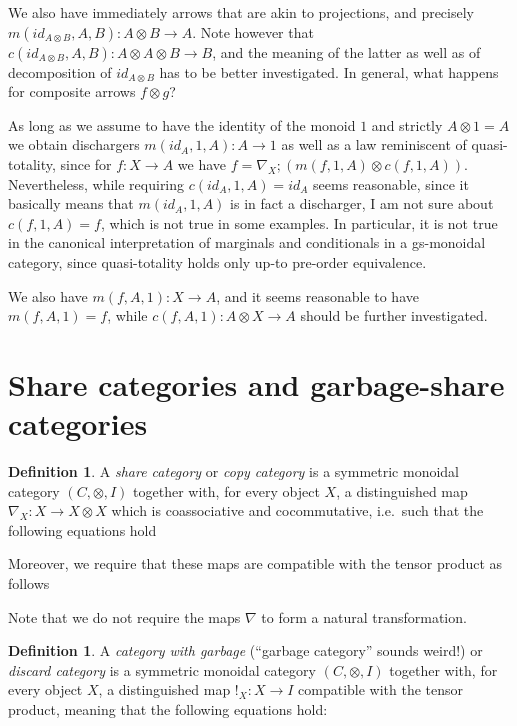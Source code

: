 \documentclass{article}
\theoremstyle{plain} %
\theoremstyle{definition} %
\newtheorem{definition}[theorem]{Definition}
\begin{document}
We also have immediately arrows that are akin to projections, and precisely $m(id_{A \otimes B}, A, B): A \otimes B \to A$. Note however that
$c(id_{A \otimes B}, A, B):  A \otimes A \otimes B \to B$, and the meaning of the latter as well as of decomposition of $id_{A \otimes B}$ has to be better investigated.
In general, what happens for composite arrows $f \otimes g$?

As long as we assume to have the identity of the monoid $1$ and strictly $A \otimes 1 = A$ we obtain dischargers $m(id_A, 1, A): A \to 1$ as well as a law reminiscent of quasi-totality, 
since for $f: X \to A$ we have
$f = \nabla_X ; (m(f, 1, A) \otimes c(f, 1, A))$. Nevertheless, while requiring $c(id_A, 1, A) = id_A$ seems reasonable, since it basically means that $m(id_A, 1, A)$ is in fact a discharger, I am not sure about 
$c(f, 1, A) = f$, which is not true in some examples. In particular, it is not true in the canonical interpretation of marginals and conditionals in a gs-monoidal category, since quasi-totality holds only 
up-to pre-order equivalence.

We also have $m(f, A, 1): X \to A$, and it seems reasonable to have $m(f, A, 1) = f$, while $c(f, A, 1): A \otimes X \to A$ should be further investigated. 

\section{Share categories and garbage-share categories}

\begin{definition}
	A \emph{share category} or \emph{copy category} is a symmetric monoidal category $(C,\otimes,I)$ together with, for every object $X$, a distinguished map $\nabla_X:X\to X\otimes X$
	which is coassociative and cocommutative, i.e.\ such that the following equations hold
	
	Moreover, we require that these maps are compatible with the tensor product as follows
\end{definition}

Note that we do not require the maps $\nabla$ to form a natural transformation.

\begin{definition}
	A \emph{category with garbage} (``garbage category'' sounds weird!) or \emph{discard category} is a symmetric monoidal category $(C,\otimes,I)$ together with, for every object $X$, a distinguished map $!_X:X\to I$ 
	compatible with the tensor product, meaning that the following equations hold:
\end{definition}
\end{document}

